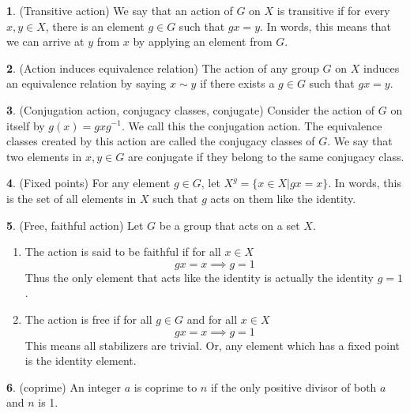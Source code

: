 \documentclass[12pt]{article}
\theoremstyle{definition}
\newtheorem{definition}{\color{NavyBlue}{\textbf{Definition}}}
\begin{document}
\begin{definition}(Transitive action)
We say that an action of $G$ on $X$ is transitive if for every $x,y \in X$, there is an element $g \in G$ such that $gx = y$. In words, this means that we can arrive at $y$ from $x$ by applying an element from $G$.
\end{definition}

\begin{definition}(Action induces equivalence relation)
The action of any group $G$ on $X$ induces an equivalence relation by saying $x \sim y$ if there exists a $g \in G$ such that $gx = y$.
\end{definition}

\begin{definition}(Conjugation action, conjugacy classes, conjugate)
Consider the action of $G$ on itself by $g(x) = gxg^{-1}$. We call this the conjugation action. The equivalence classes created by this action are called the conjugacy classes of $G$. We say that two elements in $x,y\in G$ are conjugate if they belong to the same conjugacy class.
\end{definition}

\begin{definition}(Fixed points)
For any element $g\in G$, let $X^g = \{x\in X|gx = x\}$. In words, this is the set of all elements in $X$ such that $g$ acts on them like the identity.
\end{definition}

\begin{definition}(Free, faithful action)
Let $G$ be a group that acts on a set $X$.
\begin{enumerate}
\item The action is said to be faithful if for all $x \in X$
\begin{equation}
gx = x \implies g = 1
\end{equation}
Thus the only element that acts like the identity is actually the identity $g=1$.
\item The action is free if for all $g\in G$ and for all $x \in X$
\begin{equation}
gx = x \implies g = 1
\end{equation}
This means all stabilizers are trivial. Or, any element which has a fixed point is the identity element.
\end{enumerate}
\end{definition}

\begin{definition}(coprime)
An integer $a$ is coprime to $n$ if the only positive divisor of both $a$ and $n$ is 1.
\end{definition}
\end{document}
